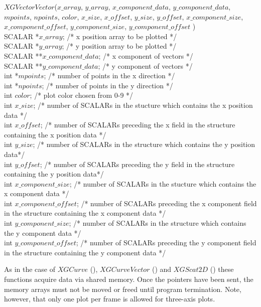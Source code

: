 \begin{flushleft}
$XGVectorVector$($x\_array$, $y\_array$, $x\_component\_data$,
$y\_component\_data$, $mpoints$, $npoints$, $color$, $x\_size$,
$x\_offset$, $y\_size$, $y\_offset$, $x\_component\_size$,
$x\_component\_offset$, $y\_component\_size$, $y\_component\_offset$ ) \\
SCALAR   *$x\_array$;    /* x position array to be plotted                         */ \\
SCALAR   *$y\_array$;    /* y position array to be plotted
*/ \\
SCALAR	**$x\_component\_data$;	/* x component of vectors	*/ \\
SCALAR	**$y\_component\_data$;	/* y component of vectors	*/ \\
int     *$mpoints$;    /* number of points in the x direction    */ \\
int     *$npoints$;    /* number of points in the y direction    */ \\
int      $color$;      /* plot color chosen from 0-9
*/ \\
int      $x\_size$;      /* number of SCALARs in the stucture which
contains the x position data	*/ \\
int      $x\_offset$;      /* number of SCALARs preceding the x field
in the structure containing the x position data		*/ \\
int      $y\_size$;      /* number of SCALARs in the structure which
contains the y position data*/ \\
int      $y\_offset$;      /* number of SCALARs preceding the y field 
in the structure containing the y position data*/ \\
int      $x\_component\_size$;      /* number of SCALARs in the stucture which
contains the x component data	*/ \\
int      $x\_component\_offset$;      /* number of SCALARs preceding the x
component field in the structure containing the x component data */ \\
int      $y\_component\_size$;      /* number of SCALARs in the structure which
contains the y component data */ \\
int      $y\_component\_offset$;      /* number of SCALARs preceding the y
component field in the structure containing the y component data */
\end{flushleft}

As in the case of $XGCurve$ (), $XGCurveVector$ () and $XGScat2D$ ()
these functions acquire data via shared memory.  Once the pointers
have been sent, the memory arrays must not be moved or freed until
program termination.  Note, however, that only one plot per frame is
allowed for three-axis plots.

